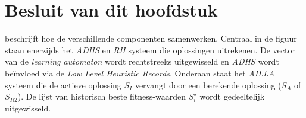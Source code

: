 \section{Besluit van dit hoofdstuk}


 beschrijft hoe de verschillende componenten samenwerken. Centraal in de figuur staan enerzijds het \emph{ADHS} en \emph{RH} systeem die oplossingen uitrekenen. De vector van de \emph{learning automaton} wordt rechtstreeks uitgewisseld en \emph{ADHS} wordt be\"invloed via de \emph{Low Level Heuristic Records}. Onderaan staat het \emph{AILLA} systeem die de actieve oplossing $S_I$ vervangt door een berekende oplossing ($S_A$ of $S_{R2}$). De lijst van historisch beste fitness-waarden $S_i^{\star}$ wordt gedeeltelijk uitgewisseld.